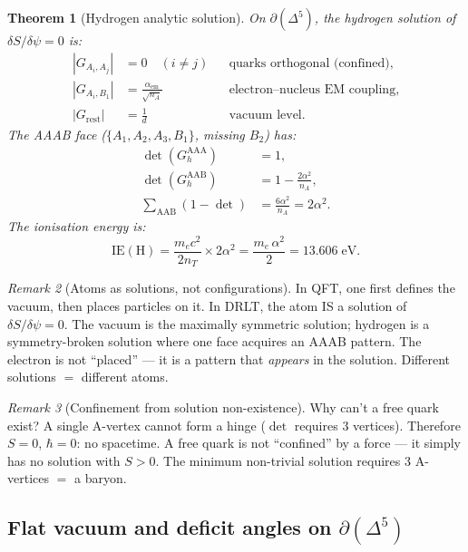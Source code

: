 \documentclass[12pt]{article}
\newtheorem{theorem}{Theorem}[section]
\theoremstyle{remark}
\newtheorem{remark}[theorem]{Remark}
\theoremstyle{definition}
\begin{document}
\begin{theorem}[Hydrogen analytic solution]
\label{thm:hydrogen_solution}
On $\partial(\Delta^5)$, the hydrogen solution of $\delta S/\delta\psi = 0$ is:
\begin{align}
|G_{A_i, A_j}| &= 0 \quad (i \ne j) &&\text{quarks orthogonal (confined)}, \\
|G_{A_i, B_1}| &= \frac{\alpha_{\mathrm{em}}}{\sqrt{n_A}} &&\text{electron--nucleus EM coupling}, \\
|G_{\mathrm{rest}}| &= \frac{1}{d} &&\text{vacuum level}.
\end{align}
The AAAB face ($\{A_1, A_2, A_3, B_1\}$, missing $B_2$) has:
\begin{align}
\det(G_h^{\mathrm{AAA}}) &= 1, \\
\det(G_h^{\mathrm{AAB}}) &= 1 - \frac{2\alpha^2}{n_A}, \\
\sum_{\mathrm{AAB}} (1 - \det) &= \frac{6\alpha^2}{n_A} = 2\alpha^2.
\end{align}
The ionisation energy is:
\begin{equation}
\boxed{\mathrm{IE}(\mathrm{H}) = \frac{m_e c^2}{2 n_T} \times 2\alpha^2 = \frac{m_e\,\alpha^2}{2} = 13.606\;\mathrm{eV}.}
\end{equation}
\end{theorem}

\begin{remark}[Atoms as solutions, not configurations]
In QFT, one first defines the vacuum, then places particles on it.  In DRLT, the atom IS a solution of $\delta S/\delta\psi = 0$.  The vacuum is the maximally symmetric solution; hydrogen is a symmetry-broken solution where one face acquires an AAAB pattern.  The electron is not ``placed'' --- it is a pattern that \emph{appears} in the solution.  Different solutions $=$ different atoms.
\end{remark}

\begin{remark}[Confinement from solution non-existence]
Why can't a free quark exist?  A single A-vertex cannot form a hinge ($\det$ requires 3 vertices).  Therefore $S = 0$, $\hbar = 0$: no spacetime.  A free quark is not ``confined'' by a force --- it simply has no solution with $S > 0$.  The minimum non-trivial solution requires 3 A-vertices $=$ a baryon.
\end{remark}

\subsection{Flat vacuum and deficit angles on $\partial(\Delta^5)$}
\label{sec:flat_vacuum}
\end{document}
